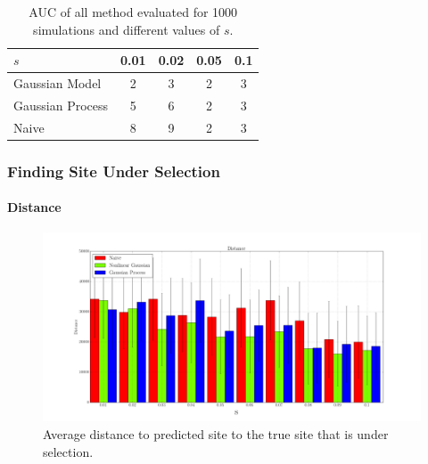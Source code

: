 \begin{table}
\centering
\begin{tabular}{ l |c c c c }
$s$& 0.01 &0.02 & 0.05 & 0.1 \\
\hline
  Gaussian Model & 2 & 3& 2 & 3 \\
Gaussian Process & 5 & 6 & 2 & 3\\
  Naive & 8 & 9 & 2 & 3\\
\end{tabular}
\caption{AUC of all method evaluated for 1000 simulations and different values of $s$.}
\end{table}


\subsubsection{Finding Site Under Selection}
\paragraph{Distance}
\begin{figure}[H]
  \centering
    \includegraphics[width=\textwidth]{dist}
  \caption{Average distance to predicted site to the true site that is under selection.}
  \label{fig:Fig1}
\end{figure}


